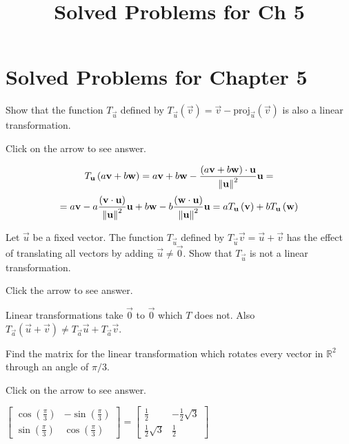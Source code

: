 \documentclass{ximera}
\title{Solved Problems for Ch 5} \license{CC BY-NC-SA 4.0}
\begin{document}
\begin{abstract}
\end{abstract}
\maketitle

\section*{Solved Problems for Chapter 5}

\begin{problem}\label{prb:6.2} Show that the function $T_{\vec{u}}$ defined by $T_{\vec{u}}
\left( \vec{v}\right) = \vec{v}-\mbox{proj}_{\vec{u}}\left(
\vec{v}\right) $ is also a linear transformation.

Click on the arrow to see answer.

\begin{expandable}
$$
T_{\mathbf{u}}\left( a\mathbf{v}+b\mathbf{w}\right) =a\mathbf{v}+b\mathbf{w}-\frac{\left( a\mathbf{v}+b\mathbf{w}\right)\cdot \mathbf{u} }{\left\lVert \mathbf{u}
\right\rVert ^{2}}\mathbf{u} =$$
$$
=a\mathbf{v}-a\frac{\left( \mathbf{v}\cdot \mathbf{u}\right) }{\left\lVert \mathbf{u} \right\rVert ^{2}}\mathbf{u}+b\mathbf{w}-b\frac{\left( \mathbf{w}\cdot \mathbf{u}
\right) }{\left\lVert \mathbf{u}\right\rVert ^{2}}\mathbf{u}
=aT_{\mathbf{u}}\left( \mathbf{v}\right) +bT_{\mathbf{u}}\left( \mathbf{w}
\right)
$$
\end{expandable}
\end{problem}

\begin{problem}\label{prb:6.3} Let $\vec{u}$ be a fixed vector. The function
$T_{\vec{u}}$ defined by $T_{\vec{u}}\vec{v}=\vec{u}+\vec{v}$ has the effect of
translating all vectors by adding $\vec{u}\neq \vec{0}$. Show that $T_{\vec{u}}$ is not a
linear transformation. 

Click the arrow to see answer.

\begin{expandable}
Linear
transformations take $\vec{0}$ to $\vec{0}$ which $T$ does not. Also $T_{\vec{a}}\left( \vec{u}+\vec{v}\right) \neq T_{\vec{a}}\vec{u}+T_{\vec{a}}
\vec{v}$.
\end{expandable}
\end{problem}

\begin{problem}\label{prb:6.11}  Find the matrix for the linear transformation which
rotates every vector in $\mathbb{R}^{2}$ through an angle of $\pi /3.$

Click on the arrow to see answer.
\begin{expandable}
$\left[
\begin{array}{cc}
\cos \left(
\frac{\pi }{3}\right) & -\sin \left( \frac{\pi }{3}\right) \\
\sin \left( \frac{\pi }{3}\right) & \cos \left( \frac{\pi }{3}\right)%
\end{array}
\right] = \left[
\begin{array}{cc}
\frac{1}{2} & -\frac{1}{2}\sqrt{3} \\
\frac{1}{2}\sqrt{3} & \frac{1}{2}
\end{array}
\right] $
\end{expandable}
\end{problem}
\end{document}

